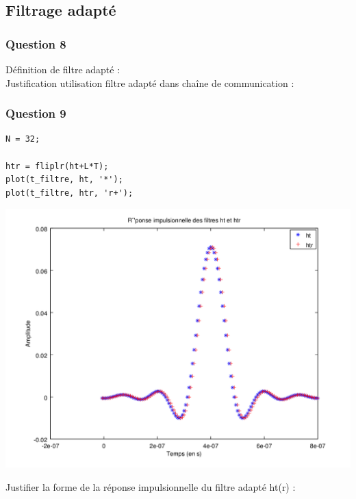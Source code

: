 \documentclass{acm_proc_article-sp}
\begin{document}
\subsection{Filtrage adapté}
\subsubsection{Question 8}
Définition de filtre adapté : \\
Justification utilisation filtre adapté dans chaîne de communication :

\subsubsection{Question 9}

\begin{center}
\begin{lstlisting}
N = 32;

htr = fliplr(ht+L*T);
plot(t_filtre, ht, '*');
plot(t_filtre, htr, 'r+');
\end{lstlisting}

\includegraphics[scale=0.45]{ht_htr_9.png}
\end{center}

Justifier la forme de la réponse impulsionnelle du filtre adapté ht(r) :
\end{document}

